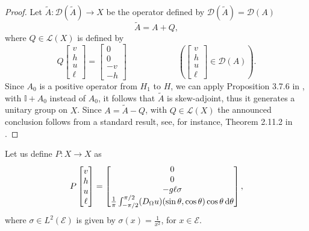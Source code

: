 \documentclass{amsart} %
\numberwithin{equation}{section}
\theoremstyle{definition}
\begin{document}
\begin{proof}
Let $\tilde A:\mathcal{D}(\tilde A)\to X$ be the operator defined by $\mathcal{D}(\tilde A)=\mathcal{D}(A)$
$$
\tilde A =A+Q,
$$
where $Q\in \mathcal{L}(X)$ is defined by
$$
Q\begin{bmatrix} v\\ h \\ u\\ \ell\end{bmatrix}=\begin{bmatrix} 0\\0 \\ -v\\ -h\end{bmatrix} \qquad\qquad\qquad\left(\begin{bmatrix} v\\h\\ u\\ \ell \end{bmatrix}\in \mathcal{D}(A)\right).
$$
Since $A_0$ is a positive operator from $H_1$ to $H$, we can apply Proposition 3.7.6 in \cite{Obs_book}, with $\mathbb{I}+A_0$ instead of $A_0$, it follows that $\tilde A$ is skew-adjoint, thus it generates a unitary group on $X$. Since $A=\tilde A-Q$, with $Q\in \mathcal{L}(X)$
the announced conclusion follows from a standard result, see, for instance, Theorem 2.11.2 in \cite{Obs_book}.
\end{proof}
Let us define $P:X\to X$ as
\begin{equation}\label{def_pert_P}
    P\begin{bmatrix}
    v\\
    h\\
    u\\
    \ell
    \end{bmatrix}=\begin{bmatrix}
        0\\
        0\\
        -g \ell\sigma\\
        \frac{1}{\pi}\int_{-\pi/2}^{\pi/2}(D_{\Omega}u)(\sin\theta,\cos\theta)\cos\theta \, {\rm d}\theta\end{bmatrix},
\end{equation}
where $\sigma\in L^2(\mathcal{E})$ is given by $\sigma(x)=\frac{1}{x^2}$, for $x\in\mathcal{E}$.
\end{document}
